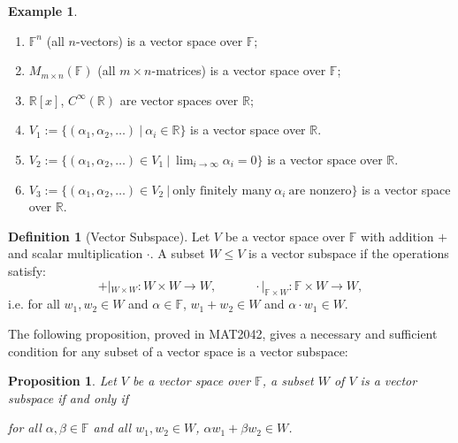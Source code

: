 \documentclass[11pt,openany]{book}
\theoremstyle{plain}
\newtheorem{proposition}[proposition]{Proposition}
\theoremstyle{definition}
\newtheorem{definition}[definition]{Definition}
\newtheorem{example}[example]{Example}
\theoremstyle{remark}
\begin{document}
\begin{example} \label{eg-v123}
    
    \begin{enumerate}
        \item $\mathbb{F}^n$ (all $n$-vectors) is a vector space over $\mathbb{F}$; 
        \item $M_{m \times n}(\mathbb{F})$ (all $m \times n$-matrices) is a vector space over $\mathbb{F}$;
        \item $\mathbb{R}[x]$, $C^{\infty}(\mathbb{R})$ are vector spaces over $\mathbb{R}$;
        \item $V_1 := \{(\alpha_1,\alpha_2,\dots)\ |\ \alpha_i \in \mathbb{R}\}$ is a vector space over $\mathbb{R}$.
        \item $V_2 := \{(\alpha_1,\alpha_2,\dots) \in V_1 \ |\ \lim_{i \to \infty} \alpha_i  = 0\}$ is a vector space over $\mathbb{R}$.
        \item $V_3 := \{(\alpha_1,\alpha_2,\dots) \in V_2 \ |\ \text{only finitely many}\ \alpha_i\ \text{are nonzero}\}$ is a vector space over $\mathbb{R}$.
    \end{enumerate}
\end{example}

\begin{definition}[Vector Subspace]
    Let $V$ be a vector space over $\mathbb{F}$ with addition $+$ and scalar multiplication $\cdot$. A subset $W \leq V$ is a vector subspace if the operations satisfy:
    $$+|_{W \times W}: W \times W \to W, \quad \quad \quad \cdot|_{\mathbb{F} \times W}: \mathbb{F} \times W \to W,$$
    i.e. for all $w_1, w_2 \in W$ and $\alpha \in \mathbb{F}$, $w_1 + w_2 \in W$ and $\alpha \cdot w_1 \in W$.
\end{definition}

The following proposition, proved in MAT2042, gives a necessary and sufficient condition for any subset of a vector space is a vector subspace:
\begin{proposition}
    Let $V$ be a vector space over $\mathbb{F}$, a subset $W$ of $V$ is a vector subspace if and only if
    \begin{center}
        for all $\alpha, \beta \in \mathbb{F}$ and all $w_1, w_2 \in W$, $\alpha w_1 + \beta w_2 \in W$.
    \end{center}
\end{proposition}
\end{document}
